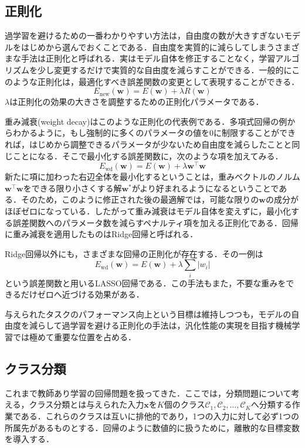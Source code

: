 \documentclass[a4paper,11pt]{jsreport}
\begin{document}
\subsection{正則化}
過学習を避けるための一番わかりやすい方法は，自由度の数が大きすぎないモデルをはじめから選んでおくことである．自由度を実質的に減らしてしまうさまざまな手法は正則化と呼ばれる．実はモデル自体を修正することなく，学習アルゴリズムを少し変更するだけで実質的な自由度を減らすことができる．一般的にこのような正則化は，最適化すべき誤差関数の変更として表現することができる．
\begin{equation}
  E_{\text{new}}(\bm{w}) 
  = E(\bm{w}) + \lambda R(\bm{w})
\end{equation}
$\lambda$は正則化の効果の大きさを調整するための正則化パラメータである．\par
重み減衰(weight decay)はこのような正則化の代表例である．多項式回帰の例からわかるように，もし強制的に多くのパラメータの値を0に制限することができれば，はじめから調整できるパラメータが少ないため自由度を減らしたことと同じことになる．そこで最小化する誤差関数に，次のような項を加えてみる．
\begin{equation}
  E_{\text{wd}}(\bm{w}) 
  = E(\bm{w}) + \lambda \bm{w}^{\top} \bm{w}
\end{equation}
新たに項に加わった右辺全体を最小化するということは，重みベクトルのノルム$\bm{w}^{\top} \bm{w}$をできる限り小さくする解$\bm{w}^*$がより好まれるようになるということである．そのため，このように修正された後の最適解では，可能な限りの$\bm{w}$の成分がほぼゼロになっている．したがって重み減衰はモデル自体を変えずに，最小化する誤差関数へのパラメータ数を減らすペナルティ項を加える正則化である．回帰に重み減衰を適用したものはRidge回帰と呼ばれる．\par
Ridge回帰以外にも，さまざまな回帰の正則化が存在する．その一例は
\begin{equation}
  E_{\text{wd}}(\bm{w}) 
  = E(\bm{w}) + \lambda \sum_i |w_i|
\end{equation}
という誤差関数と用いるLASSO回帰である．この手法もまた，不要な重みをできるだけゼロへ近づける効果がある．\par
与えられたタスクのパフォーマンス向上という目標は維持しつつも，モデルの自由度を減らして過学習を避ける正則化の手法は，汎化性能の実現を目指す機械学習では極めて重要な位置を占める．


\subsection{クラス分類}
これまで教師あり学習の回帰問題を扱ってきた．ここでは，分類問題について考える，クラス分類とは与えられた入力$\bm{x}$を$K$個のクラス$\mathcal{C}_1, \mathcal{C}_2, \dots, \mathcal{C}_K$へ分類する作業である．これらのクラスは互いに排他的であり，1つの入力に対して必ず1つの所属先があるものとする．回帰のように数値的に扱うために，離散的な目標変数を導入する．
\end{document}

